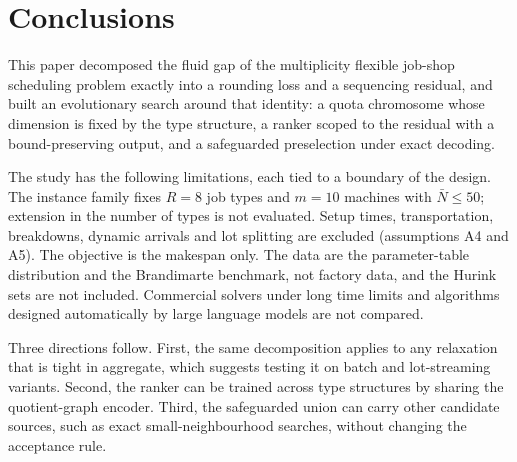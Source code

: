 \section{Conclusions}\label{sec:conclusion}
This paper decomposed the fluid gap of the multiplicity flexible job-shop scheduling problem exactly into a rounding loss
and a sequencing residual, and built an evolutionary search around that identity: a quota chromosome whose dimension is
fixed by the type structure, a ranker scoped to the residual with a bound-preserving output, and a safeguarded preselection
under exact decoding. 

The study has the following limitations, each tied to a boundary of the design. The instance family fixes $R = 8$ job types
and $m = 10$ machines with $\bar N \le 50$; extension in the number of types is not evaluated. Setup times, transportation,
breakdowns, dynamic arrivals and lot splitting are excluded (assumptions A4 and A5). The objective is the makespan only. The
data are the parameter-table distribution and the Brandimarte benchmark, not factory data, and the Hurink sets are not
included. Commercial solvers under long time limits and algorithms designed automatically by large language models are not
compared. 

Three directions follow. First, the same decomposition applies to any relaxation that is tight in aggregate, which suggests
testing it on batch and lot-streaming variants. Second, the ranker can be trained across type structures by sharing the
quotient-graph encoder. Third, the safeguarded union can carry other candidate sources, such as exact small-neighbourhood
searches, without changing the acceptance rule.
